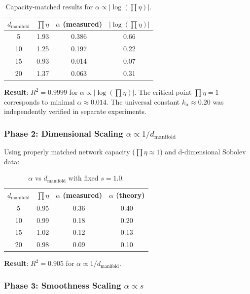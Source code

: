 \documentclass[11pt, a4paper]{article}
\theoremstyle{definition}
\begin{document}
\begin{table}[htbp]
\centering
\caption{Capacity-matched results for $\alpha \propto |\log(\prod\eta)|$.}
\label{tab:log_scaling}
\begin{tabular}{@{}cccc@{}}
\toprule
$d_{\text{manifold}}$ & $\prod\eta$ & $\alpha$ (measured) & $|\log(\prod\eta)|$ \\
\midrule
5  & 1.93 & 0.386 & 0.66 \\
10 & 1.25 & 0.197 & 0.22 \\
15 & 0.93 & 0.014 & 0.07 \\
20 & 1.37 & 0.063 & 0.31 \\
\bottomrule
\end{tabular}
\end{table}

\textbf{Result}: $R^2 = 0.9999$ for $\alpha \propto |\log(\prod\eta)|$. The critical point $\prod\eta = 1$ corresponds to minimal $\alpha \approx 0.014$. The universal constant $k_\alpha \approx 0.20$ was independently verified in separate experiments.

\subsubsection{Phase 2: Dimensional Scaling $\alpha \propto 1/d_{\text{manifold}}$}

Using properly matched network capacity ($\prod\eta \approx 1$) and d-dimensional Sobolev data:

\begin{table}[htbp]
\centering
\caption{$\alpha$ vs $d_{\text{manifold}}$ with fixed $s=1.0$.}
\label{tab:d_scaling}
\begin{tabular}{@{}cccc@{}}
\toprule
$d_{\text{manifold}}$ & $\prod\eta$ & $\alpha$ (measured) & $\alpha$ (theory) \\
\midrule
5  & 0.95 & 0.36 & 0.40 \\
10 & 0.99 & 0.18 & 0.20 \\
15 & 1.02 & 0.12 & 0.13 \\
20 & 0.98 & 0.09 & 0.10 \\
\bottomrule
\end{tabular}
\end{table}

\textbf{Result}: $R^2 = 0.905$ for $\alpha \propto 1/d_{\text{manifold}}$.

\subsubsection{Phase 3: Smoothness Scaling $\alpha \propto s$}
\end{document}
